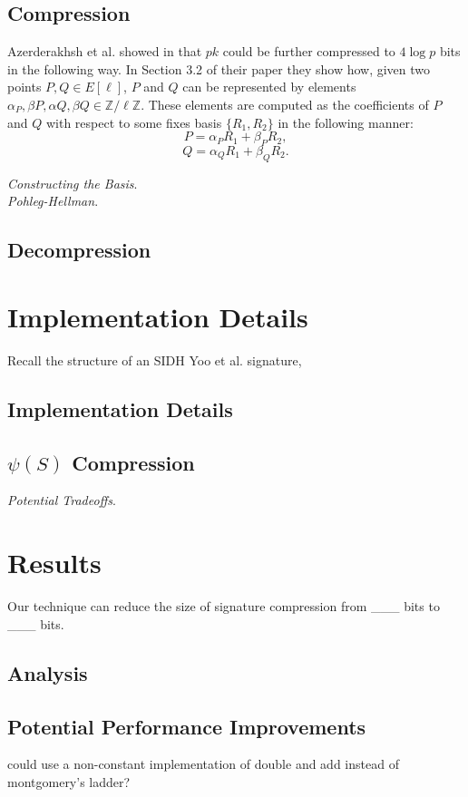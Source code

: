 \subsection{Compression}

Azerderakhsh et al. showed in \cite{compwr} that $pk$ could be further compressed to $4\log p$ bits in the following way. In Section 3.2 of their paper they show how, given two points $P, Q \in E[\ell]$, $P$ and $Q$ can be represented by elements $\alpha_{P}, \beta{P}, \alpha{Q}, \beta{Q} \in \mathbb{Z}/\ell\mathbb{Z}$. These elements are computed as the coefficients of $P$ and $Q$ with respect to some fixes basis $\{R_1, R_2\}$ in the following manner: 
$$
P = \alpha_{P}R_1 + \beta_{P}R_2,
$$
$$
Q = \alpha_{Q}R_1 + \beta_{Q}R_2.
$$

\noindent
\textit{Constructing the Basis}.\\

\noindent
\textit{Pohleg-Hellman}.

\subsection{Decompression}

\section{Implementation Details}
\label{sec:compimplementation}

Recall the structure of an SIDH Yoo et al. signature,

\subsection{Implementation Details}

\subsection{$\psi(S)$ Compression}

\noindent
\textit{Potential Tradeoffs}.

\section{Results}

Our technique can reduce the size of \sidh signature compression from \_\_\_ bits to \_\_\_ bits.

\subsection{Analysis}

\subsection{Potential Performance Improvements}

could use a non-constant implementation of double and add instead of montgomery's ladder? 

